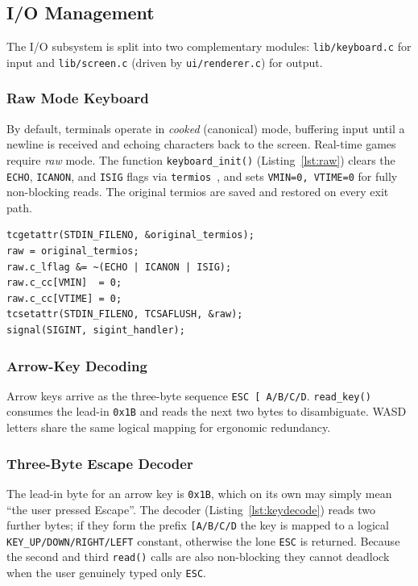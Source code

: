 \documentclass[conference]{IEEEtran}
\begin{document}
\subsection{I/O Management}
\label{sec:io}

The I/O subsystem is split into two complementary modules: \texttt{lib/keyboard.c} for input and \texttt{lib/screen.c} (driven by \texttt{ui/renderer.c}) for output.

\subsubsection{Raw Mode Keyboard}
By default, terminals operate in \emph{cooked} (canonical) mode, buffering input until a newline is received and echoing characters back to the screen. Real-time games require \emph{raw} mode. The function \texttt{keyboard\_init()} (Listing~\ref{lst:raw}) clears the \texttt{ECHO}, \texttt{ICANON}, and \texttt{ISIG} flags via \texttt{termios}~\cite{posix}, and sets \texttt{VMIN=0, VTIME=0} for fully non-blocking reads. The original termios are saved and restored on every exit path.

\begin{lstlisting}[caption={Switching the terminal into raw, non-blocking mode.},label={lst:raw}]
tcgetattr(STDIN_FILENO, &original_termios);
raw = original_termios;
raw.c_lflag &= ~(ECHO | ICANON | ISIG);
raw.c_cc[VMIN]  = 0;
raw.c_cc[VTIME] = 0;
tcsetattr(STDIN_FILENO, TCSAFLUSH, &raw);
signal(SIGINT, sigint_handler);
\end{lstlisting}

\subsubsection{Arrow-Key Decoding}
Arrow keys arrive as the three-byte sequence \texttt{ESC \texttt{[} A/B/C/D}. \texttt{read\_key()} consumes the lead-in \texttt{0x1B} and reads the next two bytes to disambiguate. WASD letters share the same logical mapping for ergonomic redundancy.

\subsubsection{Three-Byte Escape Decoder}
The lead-in byte for an arrow key is \texttt{0x1B}, which on its own may simply mean ``the user pressed Escape''. The decoder (Listing~\ref{lst:keydecode}) reads two further bytes; if they form the prefix \texttt{[A/B/C/D} the key is mapped to a logical \texttt{KEY\_UP/DOWN/RIGHT/LEFT} constant, otherwise the lone \texttt{ESC} is returned. Because the second and third \texttt{read()} calls are also non-blocking they cannot deadlock when the user genuinely typed only \texttt{ESC}.
\end{document}
